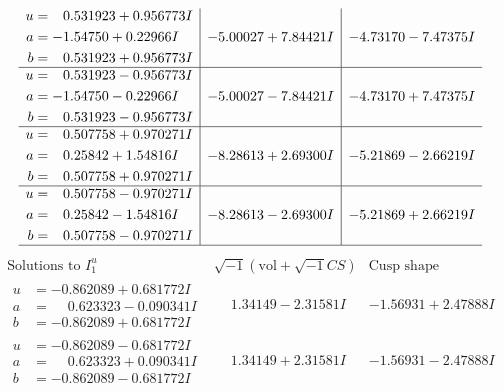 \documentclass[1p]{elsarticle_modified}
\theoremstyle{definition}
\newcommand{\I}{\sqrt{-1}}
\begin{document}
$$\begin{array}{c|c|c}
\begin{aligned}
u &= \phantom{-}0.531923 + 0.956773 I \\
a &= -1.54750 + 0.22966 I \\
b &= \phantom{-}0.531923 + 0.956773 I\end{aligned}
 & -5.00027 + 7.84421 I & -4.73170 - 7.47375 I \\ \hline\begin{aligned}
u &= \phantom{-}0.531923 - 0.956773 I \\
a &= -1.54750 - 0.22966 I \\
b &= \phantom{-}0.531923 - 0.956773 I\end{aligned}
 & -5.00027 - 7.84421 I & -4.73170 + 7.47375 I \\ \hline\begin{aligned}
u &= \phantom{-}0.507758 + 0.970271 I \\
a &= \phantom{-}0.25842 + 1.54816 I \\
b &= \phantom{-}0.507758 + 0.970271 I\end{aligned}
 & -8.28613 + 2.69300 I & -5.21869 - 2.66219 I \\ \hline\begin{aligned}
u &= \phantom{-}0.507758 - 0.970271 I \\
a &= \phantom{-}0.25842 - 1.54816 I \\
b &= \phantom{-}0.507758 - 0.970271 I\end{aligned}
 & -8.28613 - 2.69300 I & -5.21869 + 2.66219 I\\
 \hline 
 \end{array}$$\newpage$$\begin{array}{c|c|c}  
\text{Solutions to }I^u_{1}& \I (\text{vol} + \sqrt{-1}CS) & \text{Cusp shape}\\
 \hline 
\begin{aligned}
u &= -0.862089 + 0.681772 I \\
a &= \phantom{-}0.623323 - 0.090341 I \\
b &= -0.862089 + 0.681772 I\end{aligned}
 & \phantom{-}1.34149 - 2.31581 I & -1.56931 + 2.47888 I \\ \hline\begin{aligned}
u &= -0.862089 - 0.681772 I \\
a &= \phantom{-}0.623323 + 0.090341 I \\
b &= -0.862089 - 0.681772 I\end{aligned}
 & \phantom{-}1.34149 + 2.31581 I & -1.56931 - 2.47888 I \\ \hline\begin{aligned}

\end{aligned}
\end{array}$$
\end{document}
